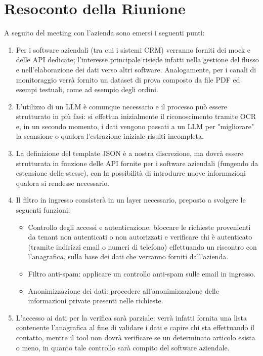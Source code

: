 \documentclass[11pt, a4paper]{article}
\begin{document}
\section{Resoconto della Riunione}
A seguito del meeting con l'azienda sono emersi i seguenti punti:
\begin{enumerate}
	\item Per i software aziendali (tra cui i sistemi CRM) verranno forniti dei mock e delle API dedicate; l'interesse principale risiede infatti nella gestione del flusso e nell'elaborazione dei dati verso altri software. Analogamente, per i canali di monitoraggio verrà fornito un dataset di prova composto da file PDF ed esempi testuali, come ad esempio degli ordini.
	\item L'utilizzo di un LLM è comunque necessario e il processo può essere strutturato in più fasi: si effettua inizialmente il riconoscimento tramite OCR e, in un secondo momento, i dati vengono passati a un LLM per "migliorare" la scansione o qualora l'estrazione iniziale risulti incompleta.
	\item La definizione del template JSON è a nostra discrezione, ma dovrà essere strutturata in funzione delle API fornite per i software aziendali (fungendo da estensione delle stesse), con la possibilità di introdurre nuove informazioni qualora si rendesse necessario.
	\item Il filtro in ingresso consisterà in un layer necessario, preposto a svolgere le seguenti funzioni:
	\begin{itemize}
		\item Controllo degli accessi e autenticazione: bloccare le richieste provenienti da tenant non autenticati o non autorizzati e verificare chi è autenticato (tramite indirizzi email o numeri di telefono) effettuando un riscontro con l'anagrafica, sulla base dei dati che verranno forniti dall'azienda.
		\item Filtro anti-spam: applicare un controllo anti-spam sulle email in ingresso.
		\item Anonimizzazione dei dati: procedere all'anonimizzazione delle informazioni private presenti nelle richieste.
	\end{itemize}
	\item L'accesso ai dati per la verifica sarà parziale: verrà infatti fornita una lista contenente l'anagrafica al fine di validare i dati e capire chi sta effettuando il contatto, mentre il tool non dovrà verificare se un determinato articolo esista o meno, in quanto tale controllo sarà compito del software aziendale.

\end{enumerate}
\end{document}
